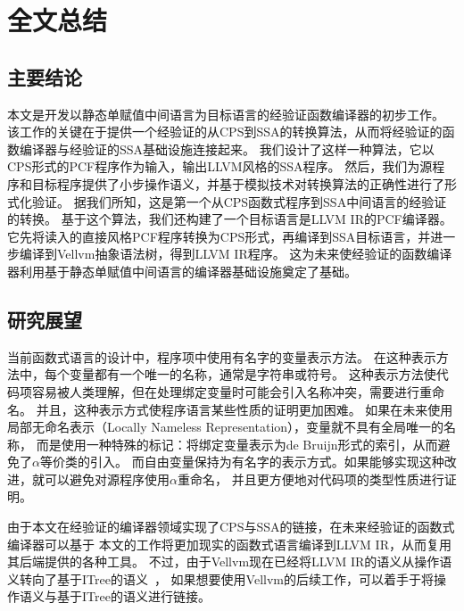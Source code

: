 
\chapter{全文总结} \label{ch:summary}

\section{主要结论}

本文是开发以静态单赋值中间语言为目标语言的经验证函数编译器的初步工作。
该工作的关键在于提供一个经验证的从CPS到SSA的转换算法，从而将经验证的函数编译器与经验证的SSA基础设施连接起来。
我们设计了这样一种算法，它以CPS形式的PCF程序作为输入，输出LLVM风格的SSA程序。
然后，我们为源程序和目标程序提供了小步操作语义，并基于模拟技术对转换算法的正确性进行了形式化验证。
据我们所知，这是第一个从CPS函数式程序到SSA中间语言的经验证的转换。
基于这个算法，我们还构建了一个目标语言是LLVM IR的PCF编译器。
它先将读入的直接风格PCF程序转换为CPS形式，再编译到SSA目标语言，并进一步编译到Vellvm抽象语法树，得到LLVM IR程序。
这为未来使经验证的函数编译器利用基于静态单赋值中间语言的编译器基础设施奠定了基础。

\section{研究展望}

当前函数式语言的设计中，程序项中使用有名字的变量表示方法。
在这种表示方法中，每个变量都有一个唯一的名称，通常是字符串或符号。
这种表示方法使代码项容易被人类理解，但在处理绑定变量时可能会引入名称冲突，需要进行重命名。
并且，这种表示方式使程序语言某些性质的证明更加困难。
如果在未来使用局部无命名表示（Locally Nameless Representation），变量就不具有全局唯一的名称，
而是使用一种特殊的标记：将绑定变量表示为de Bruijn形式的索引，从而避免了$\alpha$等价类的引入。
而自由变量保持为有名字的表示方式。如果能够实现这种改进，就可以避免对源程序使用$\alpha$重命名，
并且更方便地对代码项的类型性质进行证明。

由于本文在经验证的编译器领域实现了CPS与SSA的链接，在未来经验证的函数式编译器可以基于
本文的工作将更加现实的函数式语言编译到LLVM IR，从而复用其后端提供的各种工具。
不过，由于Vellvm现在已经将LLVM IR的语义从操作语义转向了基于ITree的语义~\cite{itree2019,itreevellvm2021}，
如果想要使用Vellvm的后续工作，可以着手于将操作语义与基于ITree的语义进行链接。
